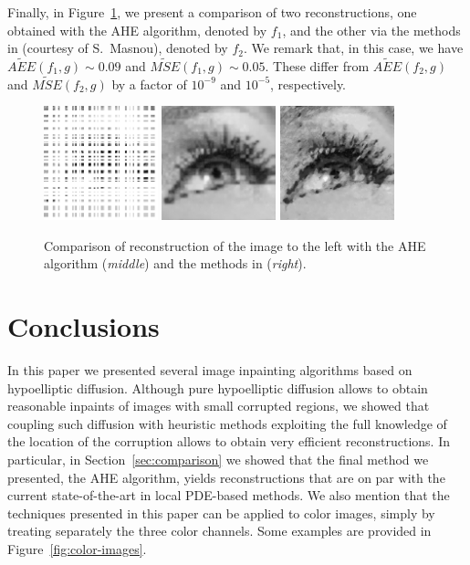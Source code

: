\documentclass[proc]{edpsmath}
\begin{document}
Finally, in Figure~\ref{fig:masnou}, we present a comparison of two reconstructions, one obtained with the AHE algorithm, denoted by $f_1$, and the other via the methods in \cite{cao} (courtesy of S.\ Masnou), denoted by $f_2$. We remark that, in this case, we have $\widetilde{AEE}(f_1,g)\sim 0.09$ and $\widetilde{MSE}(f_1,g)\sim 0.05$. These differ from $\widetilde{AEE}(f_2,g)$ and $\widetilde{MSE}(f_2,g)$ by a factor of $10^{-9}$ and $10^{-5}$, respectively.

\begin{figure}
  \includegraphics[height = 3.3cm]{imgs/eye-corr-white}\qquad
  \includegraphics[height = 3.3cm]{imgs/eye-ahe}\qquad
  \includegraphics[height = 3.3cm]{imgs/masnou}
  \caption{Comparison of reconstruction of the image to the left with the AHE algorithm (\emph{middle}) and the methods in \cite{cao} (\emph{right}).}
  \label{fig:masnou}
\end{figure}


\section{Conclusions}

In this paper we presented several image inpainting algorithms based on hypoelliptic diffusion. Although pure hypoelliptic diffusion allows to obtain reasonable inpaints of images with small corrupted regions, we showed that coupling such diffusion with heuristic methods exploiting the full knowledge of the location of the corruption allows to obtain very efficient reconstructions. 
In particular, in Section~\ref{sec:comparison} we showed that the final method we presented, the AHE algorithm, yields reconstructions that are on par with the current state-of-the-art in local PDE-based methods.
We also mention that the techniques presented in this paper can be applied to color images, simply by treating separately the three color channels. Some examples are provided in Figure~\ref{fig:color-images}.
\end{document}
